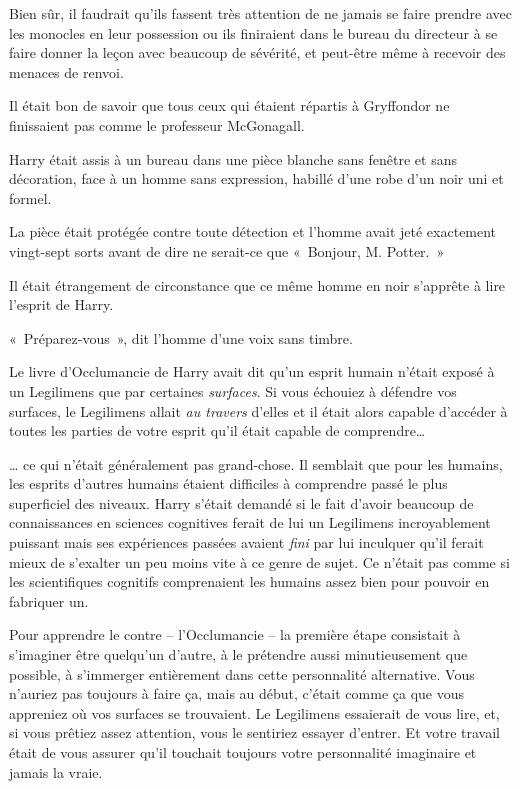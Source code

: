 Bien sûr, il faudrait qu'ils fassent très attention de ne jamais se faire prendre avec les monocles en leur possession ou ils finiraient dans le bureau du directeur à se faire donner la leçon avec beaucoup de sévérité, et peut-être même à recevoir des menaces de renvoi.

Il était bon de savoir que tous ceux qui étaient répartis à Gryffondor ne finissaient pas comme le professeur McGonagall.

\later

Harry était assis à un bureau dans une pièce blanche sans fenêtre et sans décoration, face à un homme sans expression, habillé d’une robe d'un noir uni et formel.

La pièce était protégée contre toute détection et l'homme avait jeté exactement vingt-sept sorts avant de dire ne serait-ce que «~Bonjour, M. Potter.~»

Il était étrangement de circonstance que ce même homme en noir s'apprête à lire l'esprit de Harry.

«~Préparez-vous~», dit l'homme d'une voix sans timbre.

Le livre d'Occlumancie de Harry avait dit qu'un esprit humain n'était exposé à un Legilimens que par certaines \emph{surfaces}.
Si vous échouiez à défendre vos surfaces, le Legilimens allait \emph{au travers} d'elles et il était alors capable d'accéder à toutes les parties de votre esprit qu'il était capable de comprendre…

… ce qui n'était généralement pas grand-chose.
Il semblait que pour les humains, les esprits d'autres humains étaient difficiles à comprendre passé le plus superficiel des niveaux.
Harry s'était demandé si le fait d'avoir beaucoup de connaissances en sciences cognitives ferait de lui un Legilimens incroyablement puissant mais ses expériences passées avaient \emph{fini} par lui inculquer qu'il ferait mieux de s'exalter un peu moins vite à ce genre de sujet.
Ce n'était pas comme si les scientifiques cognitifs comprenaient les humains assez bien pour pouvoir en fabriquer un.

Pour apprendre le contre -- l'Occlumancie -- la première étape consistait à s'imaginer être quelqu'un d'autre, à le prétendre aussi minutieusement que possible, à s'immerger entièrement dans cette personnalité alternative.
Vous n'auriez pas toujours à faire ça, mais au début, c'était comme ça que vous appreniez où vos surfaces se trouvaient.
Le Legilimens essaierait de vous lire, et, si vous prêtiez assez attention, vous le sentiriez essayer d'entrer.
Et votre travail était de vous assurer qu'il touchait toujours votre personnalité imaginaire et jamais la vraie.

